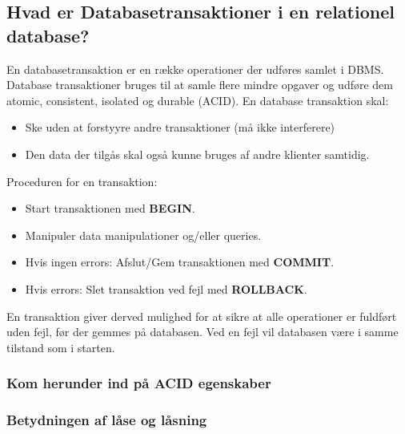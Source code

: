\newpage

\subsection{Hvad er Databasetransaktioner i en relationel database?}
En databasetransaktion er en række operationer der udføres samlet i DBMS. Database transaktioner bruges til at samle flere mindre opgaver og udføre dem atomic, consistent, isolated og durable (ACID). En database transaktion skal:

\begin{itemize}
	\item Ske uden at forstyyre andre transaktioner (må ikke interferere)
	\item Den data der tilgås skal også kunne bruges af andre klienter samtidig.
\end{itemize}

Proceduren for en transaktion:

\begin{itemize}
	\item Start transaktionen med \textbf{BEGIN}.
	\item Manipuler data manipulationer og/eller queries.
	\item Hvis ingen errors: Afslut/Gem transaktionen med \textbf{COMMIT}.
	\item Hvis errors: Slet transaktion ved fejl med \textbf{ROLLBACK}.
\end{itemize}

En transaktion giver derved mulighed for at sikre at alle operationer er fuldført uden fejl, før der gemmes på databasen. Ved en fejl vil databasen være i samme tilstand som i starten.
\subsubsection{Kom herunder ind på ACID egenskaber}

\subsubsection{Betydningen af låse og låsning}